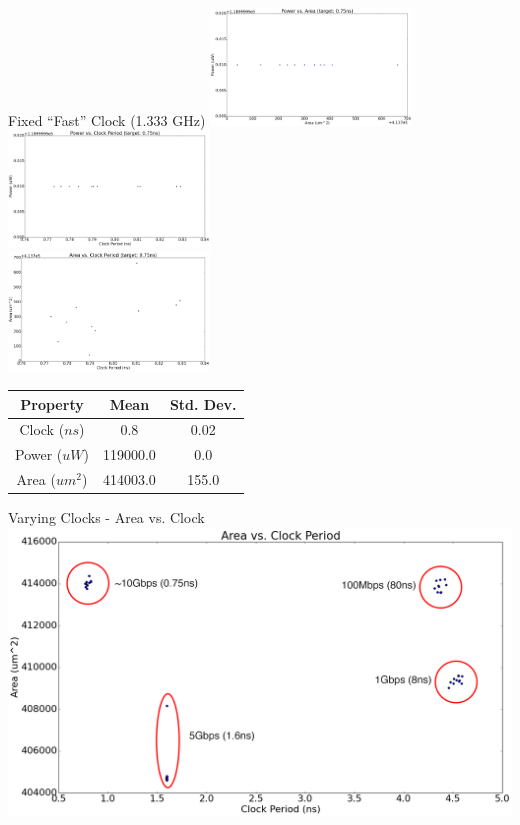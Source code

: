 \documentclass{beamer}
\begin{document}
\begin{frame}{Fixed ``Fast'' Clock (1.333 GHz)}
\noindent
\includegraphics[width=0.4\textwidth]{../img/dse_fast/powerVSarea.png}\hspace{0.2\textwidth}%
\includegraphics[width=0.4\textwidth]{../img/dse_fast/powerVSclock.png}\\[2em]
\includegraphics[width=0.4\textwidth]{../img/dse_fast/areaVSclock.png}\hspace{0.2\textwidth}%
    \tiny
    \begin{tabular}{c | c | c }
Property & Mean & Std. Dev.  \\ \hline
Clock ($ns$) & 0.8 & 0.02  \\
Power ($uW$) & 119000.0 & 0.0  \\
Area ($um^2$) & 414003.0 & 155.0 \\
\end{tabular} \par
\end{frame}


\begin{frame}{Varying Clocks - Area vs. Clock}
\noindent
\includegraphics[width=1.0\textwidth]{../img/dse_all/areaVSclock.png}
\end{frame}
\end{document}
